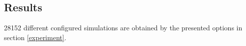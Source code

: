 \subsection{Results} \label{results}

28152 different configured simulations are obtained by the presented options in section \ref{experiment}.
